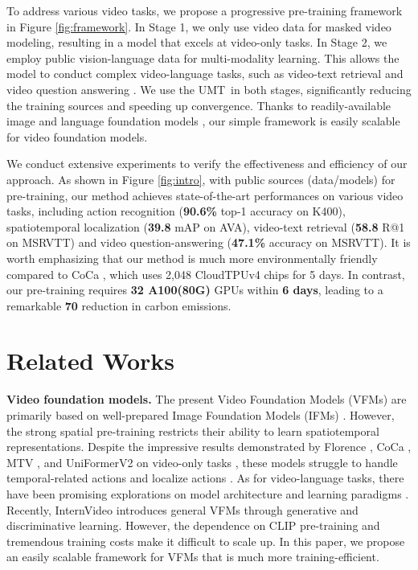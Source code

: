 \documentclass[10pt,twocolumn,letterpaper]{article}
\def\Modelnamelight{UMT}
\begin{document}
To address various video tasks,
we propose a progressive pre-training framework in Figure \ref{fig:framework}. 
In Stage 1, 
we only use video data for masked video modeling, 
resulting in a model that excels at video-only tasks.
In Stage 2, 
we employ public vision-language data for multi-modality learning. 
This allows the model to conduct complex video-language tasks, 
such as video-text retrieval \cite{msrvtt,lsmdc} and video question answering \cite{anet_qa,msrvtt_qa}. 
We use the \Modelnamelight\ in both stages, 
significantly reducing the training sources and speeding up convergence. 
Thanks to readily-available image and language foundation models \cite{clip,beitv2,lu2019vilbert,opt,flant5}, 
our simple framework is easily scalable for video foundation models.

We conduct extensive experiments to verify the effectiveness and efficiency of our approach.
As shown in Figure \ref{fig:intro},
with public sources (data/models) for pre-training,
our method achieves state-of-the-art performances on various video tasks,
including action recognition \cite{k400,k600,k700,mit,sth} (\textbf{90.6\%} top-1 accuracy on K400), 
spatiotemporal localization \cite{ava} (\textbf{39.8} mAP on AVA), 
video-text retrieval \cite{msrvtt,didemo,anet,lsmdc,msvd} (\textbf{58.8} R@1 on MSRVTT) and video question-answering \cite{anet_qa,msrvtt_qa,msrvtt_mc} (\textbf{47.1\%} accuracy on MSRVTT).
It is worth emphasizing that our method is much more environmentally friendly compared to CoCa \cite{coca}, which uses 2,048 CloudTPUv4 chips for 5 days. 
In contrast, 
our pre-training requires \textbf{32 A100(80G)} GPUs within \textbf{6 days}, 
leading to a remarkable \textbf{70} reduction in carbon emissions. \section{Related Works}


\noindent\textbf{Video foundation models.}
The present Video Foundation Models (VFMs) are primarily based on well-prepared Image Foundation Models (IFMs) \cite{coca,mtv,vivit,cover,uniformerv2,fu2021violet,li2022lavender,wang2022omnivl,xue2022clip}. 
However, 
the strong spatial pre-training restricts their ability to learn spatiotemporal representations. 
Despite the impressive results demonstrated by Florence \cite{florence}, CoCa \cite{coca}, MTV \cite{mtv}, and UniFormerV2 \cite{uniformerv2} on video-only tasks \cite{k400,k600,k700}, 
these models struggle to handle temporal-related actions \cite{sth,finegym} and localize actions \cite{ava,thumos}. 
As for video-language tasks, 
there have been promising explorations on model architecture \cite{lei2021less,wang2022all,lei2022revealing} and learning paradigms \cite{xu2021videoclip,zellers2021merlot,fu2021violet,li2022lavender,wang2022omnivl}. 
Recently, 
InternVideo \cite{Wang2022InternVideoGV} introduces general VFMs through generative and discriminative learning.
However, 
the dependence on CLIP pre-training and tremendous training costs make it difficult to scale up.
In this paper, 
we propose an easily scalable framework for VFMs that is much more training-efficient.
\end{document}

